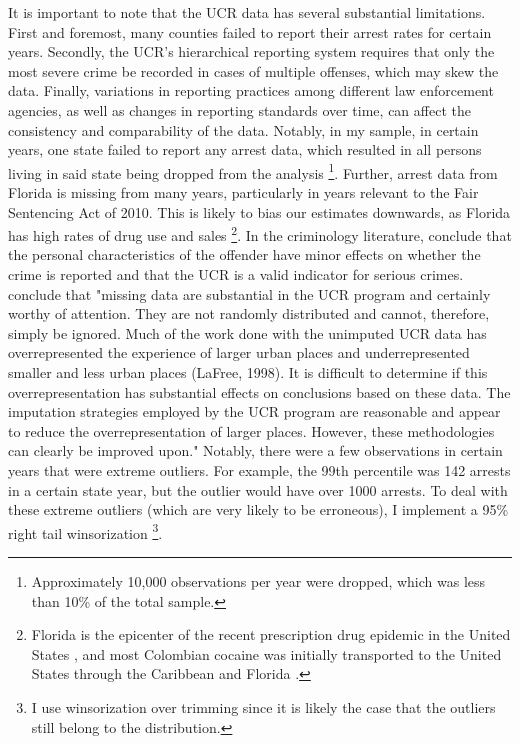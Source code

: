 \documentclass{article}
\begin{document}
It is important to note that the UCR data has several substantial limitations. First and foremost, many counties failed to report their arrest rates for certain years. Secondly, the UCR's hierarchical reporting system requires that only the most severe crime be recorded in cases of multiple offenses, which may skew the data. Finally, variations in reporting practices among different law enforcement agencies, as well as changes in reporting standards over time, can affect the consistency and comparability of the data. Notably, in my sample, in certain years, one state failed to report any arrest data, which resulted in all persons living in said state being dropped from the analysis \footnote{Approximately 10,000 observations per year were dropped, which was less than 10\% of the total sample.}. Further, arrest data from Florida is missing from many years, particularly in years relevant to the Fair Sentencing Act of 2010. This is likely to bias our estimates downwards, as Florida has high rates of drug use and sales \footnote{Florida is the epicenter of the recent prescription drug epidemic in the United States \citep{lee}, and most Colombian cocaine was initially transported to the United States through the Caribbean and Florida \citep{williams}.}.  In the criminology literature, \cite{gove} conclude that the personal characteristics of the offender have minor effects on whether the crime is reported and that the UCR is a valid indicator for serious crimes. \cite{lynch} conclude that "missing data are substantial in the UCR program and certainly worthy of attention. They are not randomly distributed and cannot, therefore, simply be ignored. Much of the work done with the unimputed UCR data has overrepresented the experience of larger urban places and underrepresented smaller and less urban places (LaFree, 1998). It is difficult to determine if this overrepresentation has substantial effects on conclusions based on these data. The imputation strategies employed by the UCR program are reasonable and appear to reduce the overrepresentation of larger places. However, these methodologies can clearly be improved upon." Notably, there were a few observations in certain years that were extreme outliers. For example, the 99th percentile was 142 arrests in a certain state year, but the outlier would have over 1000 arrests. To deal with these extreme outliers (which are very likely to be erroneous), I implement a 95\% right tail winsorization \footnote{I use winsorization over trimming since it is likely the case that the outliers still belong to the distribution.}. 
\end{document}
